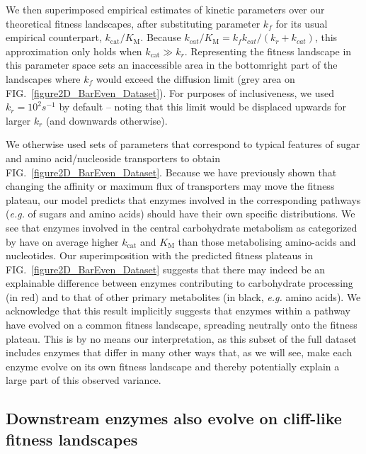 \documentclass[11pt,onecolumn]{article}
\begin{document}
We then superimposed empirical estimates of kinetic parameters over our theoretical fitness landscapes, after substituting parameter $k_f$ for its usual empirical counterpart, $k_\text{cat} / K_\text{M}$. Because $k_{cat}/K_\text{M} = k_fk_{cat}/(k_r+k_{cat})$, this approximation only holds when $k_\text{cat} \gg k_r$. Representing the fitness landscape in this parameter space
sets an inaccessible area in the bottomright part of the landscapes where $k_f$ would exceed the diffusion limit (grey area on FIG.~\ref{figure2D_BarEven_Dataset}). For purposes of inclusiveness, we used $k_r=10^{2}s^{-1}$ by default -- noting that this limit would be displaced upwards for larger $k_r$ (and downwards otherwise).

We otherwise used sets of parameters that correspond to typical features of sugar and amino acid/nucleoside transporters to obtain FIG.~\ref{figure2D_BarEven_Dataset}. Because we have previously shown that changing the affinity or maximum flux of transporters may move the fitness plateau, our model predicts that enzymes involved in the corresponding pathways (\textit{e.g.} of sugars and amino acids) should have their own specific distributions. We see that enzymes involved in the central carbohydrate metabolism as categorized by \citet{Bar-Even11} have on average higher $k_\text{cat}$ and $K_\text{M}$ than those metabolising amino-acids and nucleotides. Our superimposition with the predicted fitness plateaus in FIG.~\ref{figure2D_BarEven_Dataset} suggests that there may indeed be an explainable difference between enzymes contributing to carbohydrate processing (in red) and to that of other primary metabolites (in black, \textit{e.g.} amino acids).
We acknowledge that this result implicitly suggests that enzymes within a pathway have evolved on a common fitness landscape, spreading neutrally onto the fitness plateau. This is by no means our interpretation, as this subset of the full dataset includes enzymes that differ in many other ways that, as we will see, make each enzyme evolve on its own fitness landscape and thereby potentially explain a large part of this observed variance. 

\subsection{Downstream enzymes also evolve on cliff-like fitness landscapes}
\end{document}
